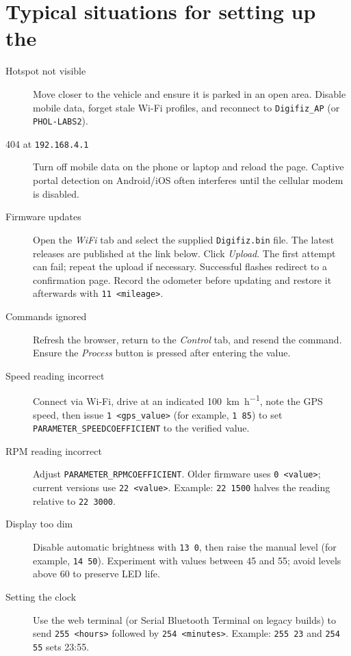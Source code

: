 \chapter{Typical situations for setting up the \ReplicaNextLong{}}\label{ch:replica-next-scenarios}

\begin{description}
    \item[Hotspot not visible] Move closer to the vehicle and ensure it is parked in an open area. Disable mobile data, forget stale Wi-Fi profiles, and reconnect to \texttt{Digifiz\_AP} (or \texttt{PHOL-LABS2}).
    \item[404 at \texttt{192.168.4.1}] Turn off mobile data on the phone or laptop and reload the page. Captive portal detection on Android/iOS often interferes until the cellular modem is disabled.
    \item[Firmware updates] Open the \emph{WiFi} tab and select the supplied \texttt{Digifiz.bin} file. The latest releases are published at the link below.
        Click \emph{Upload}. The first attempt can fail; repeat the upload if necessary. Successful flashes redirect to a confirmation page. Record the odometer before updating and restore it afterwards with \verb|11 <mileage>|.
    \item[Commands ignored] Refresh the browser, return to the \emph{Control} tab, and resend the command. Ensure the \emph{Process} button is pressed after entering the value.
    \item[Speed reading incorrect] Connect via Wi-Fi, drive at an indicated \SI{100}{\kilo\metre\per\hour}, note the GPS speed, then issue \verb|1 <gps_value>| (for example, \verb|1 85|) to set \texttt{PARAMETER\_SPEEDCOEFFICIENT} to the verified value.
    \item[RPM reading incorrect] Adjust \texttt{PARAMETER\_RPMCOEFFICIENT}. Older firmware uses \verb|0 <value>|; current versions use \verb|22 <value>|. Example: \verb|22 1500| halves the reading relative to \verb|22 3000|.
    \item[Display too dim] Disable automatic brightness with \verb|13 0|, then raise the manual level (for example, \verb|14 50|). Experiment with values between 45 and 55; avoid levels above 60 to preserve LED life.
    \item[Setting the clock] Use the web terminal (or Serial Bluetooth Terminal on legacy builds) to send \verb|255 <hours>| followed by \verb|254 <minutes>|. Example: \verb|255 23| and \verb|254 55| sets 23:55.

\end{description}
